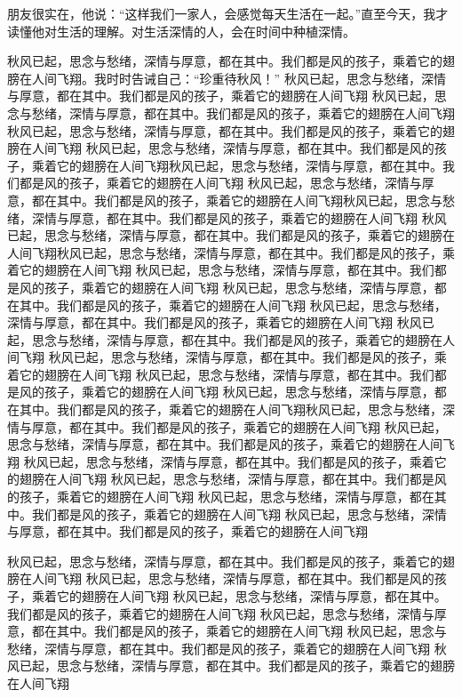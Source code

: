 朋友很实在，他说：“这样我们一家人，会感觉每天生活在一起。”直至今天，我才读懂他对生活的理解。对生活深情的人，会在时间中种植深情。







秋风已起，思念与愁绪，深情与厚意，都在其中。我们都是风的孩子，乘着它的翅膀在人间飞翔。我时时告诫自己：“珍重待秋风！”
秋风已起，思念与愁绪，深情与厚意，都在其中。我们都是风的孩子，乘着它的翅膀在人间飞翔
秋风已起，思念与愁绪，深情与厚意，都在其中。我们都是风的孩子，乘着它的翅膀在人间飞翔秋风已起，思念与愁绪，深情与厚意，都在其中。我们都是风的孩子，乘着它的翅膀在人间飞翔
秋风已起，思念与愁绪，深情与厚意，都在其中。我们都是风的孩子，乘着它的翅膀在人间飞翔秋风已起，思念与愁绪，深情与厚意，都在其中。我们都是风的孩子，乘着它的翅膀在人间飞翔
秋风已起，思念与愁绪，深情与厚意，都在其中。我们都是风的孩子，乘着它的翅膀在人间飞翔秋风已起，思念与愁绪，深情与厚意，都在其中。我们都是风的孩子，乘着它的翅膀在人间飞翔
秋风已起，思念与愁绪，深情与厚意，都在其中。我们都是风的孩子，乘着它的翅膀在人间飞翔秋风已起，思念与愁绪，深情与厚意，都在其中。我们都是风的孩子，乘着它的翅膀在人间飞翔
秋风已起，思念与愁绪，深情与厚意，都在其中。我们都是风的孩子，乘着它的翅膀在人间飞翔
秋风已起，思念与愁绪，深情与厚意，都在其中。我们都是风的孩子，乘着它的翅膀在人间飞翔
秋风已起，思念与愁绪，深情与厚意，都在其中。我们都是风的孩子，乘着它的翅膀在人间飞翔
秋风已起，思念与愁绪，深情与厚意，都在其中。我们都是风的孩子，乘着它的翅膀在人间飞翔
秋风已起，思念与愁绪，深情与厚意，都在其中。我们都是风的孩子，乘着它的翅膀在人间飞翔
秋风已起，思念与愁绪，深情与厚意，都在其中。我们都是风的孩子，乘着它的翅膀在人间飞翔
秋风已起，思念与愁绪，深情与厚意，都在其中。我们都是风的孩子，乘着它的翅膀在人间飞翔秋风已起，思念与愁绪，深情与厚意，都在其中。我们都是风的孩子，乘着它的翅膀在人间飞翔
秋风已起，思念与愁绪，深情与厚意，都在其中。我们都是风的孩子，乘着它的翅膀在人间飞翔
秋风已起，思念与愁绪，深情与厚意，都在其中。我们都是风的孩子，乘着它的翅膀在人间飞翔
秋风已起，思念与愁绪，深情与厚意，都在其中。我们都是风的孩子，乘着它的翅膀在人间飞翔
秋风已起，思念与愁绪，深情与厚意，都在其中。我们都是风的孩子，乘着它的翅膀在人间飞翔
秋风已起，思念与愁绪，深情与厚意，都在其中。我们都是风的孩子，乘着它的翅膀在人间飞翔

秋风已起，思念与愁绪，深情与厚意，都在其中。我们都是风的孩子，乘着它的翅膀在人间飞翔
秋风已起，思念与愁绪，深情与厚意，都在其中。我们都是风的孩子，乘着它的翅膀在人间飞翔
秋风已起，思念与愁绪，深情与厚意，都在其中。我们都是风的孩子，乘着它的翅膀在人间飞翔
秋风已起，思念与愁绪，深情与厚意，都在其中。我们都是风的孩子，乘着它的翅膀在人间飞翔
秋风已起，思念与愁绪，深情与厚意，都在其中。我们都是风的孩子，乘着它的翅膀在人间飞翔
秋风已起，思念与愁绪，深情与厚意，都在其中。我们都是风的孩子，乘着它的翅膀在人间飞翔

